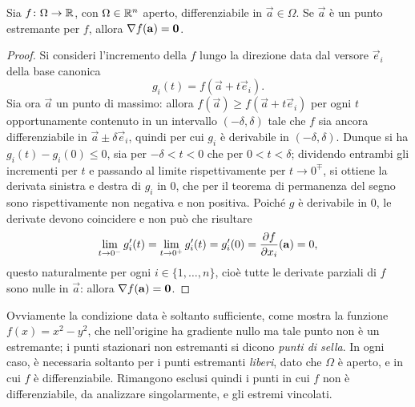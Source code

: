 \begin{teorema}[di Fermat]
Sia $f\colon\Omega\to\mathbb{R}$, con $\Omega\in\mathbb{R}^n$ aperto, differenziabile in $\vec a\in\Omega$. Se $\vec a$ è un punto estremante per $f$, allora $\nabla f(\mathbf{a})=\mathbf{0}$.
\end{teorema}
\begin{proof}
Si consideri l'incremento della $f$ lungo la direzione data dal versore $\vec e_i$ della base canonica
\[
g_i(t)=f(\vec a+t\vec e_i).
\]
Sia ora $\vec a$ un punto di massimo: allora $f(\vec a)\geq f(\vec a+t\vec e_i)$ per ogni $t$ opportunamente contenuto in un intervallo $(-\delta,\delta)$ tale che $f$ sia ancora differenziabile in $\vec a\pm\delta\vec e_i$, quindi per cui $g_i$ è derivabile in $(-\delta,\delta)$.
Dunque si ha $g_i(t)-g_i(0)\leq 0$, sia per $-\delta<t<0$ che per $0<t<\delta$; dividendo entrambi gli incrementi per $t$ e passando al limite rispettivamente per $t\to0^\mp$, si ottiene la derivata sinistra e destra di $g_i$ in $0$, che per il teorema di permanenza del segno sono rispettivamente non negativa e non positiva. Poiché $g$ è derivabile in $0$, le derivate devono coincidere e non può che risultare
\[
\lim_{t\to 0^-}g'_i(t)=\lim_{t\to 0^+}g'_i(t)=g_i'(0)=\frac{\partial {f}}{\partial {x_i}}(\mathbf{a})=0,
\]
questo naturalmente per ogni $i\in\{1,\dots,n\}$, cioè tutte le derivate parziali di $f$ sono nulle in $\vec a$: allora $\nabla f(\mathbf{a})=\mathbf{0}$.
\end{proof}
Ovviamente la condizione data è soltanto sufficiente, come mostra la funzione $f(x)=x^2-y^2$, che nell'origine ha gradiente nullo ma tale punto non è un estremante; i punti stazionari non estremanti si dicono \emph{punti di sella}. In ogni caso, è necessaria soltanto per i punti estremanti \emph{liberi}, dato che $\Omega$ è aperto, e in cui $f$ è differenziabile. Rimangono esclusi quindi i punti in cui $f$ non è differenziabile, da analizzare singolarmente, e gli estremi vincolati.

